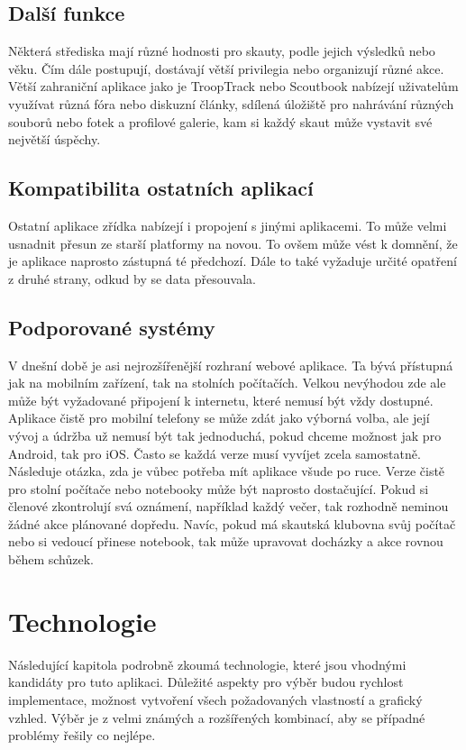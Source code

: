 \documentclass[twoside]{ctuthesis}
\begin{document}
\section{Další funkce} 
Některá střediska mají různé hodnosti pro skauty, podle jejich výsledků nebo věku. Čím dále postupují, dostávají větší privilegia nebo organizují různé akce. \\
Větší zahraniční aplikace jako je TroopTrack nebo Scoutbook nabízejí uživatelům využívat různá fóra nebo diskuzní články, sdílená úložiště pro nahrávání různých souborů nebo fotek a profilové galerie, kam si každý skaut může vystavit své největší úspěchy.

\section{Kompatibilita ostatních aplikací} 
Ostatní aplikace zřídka nabízejí i propojení s jinými aplikacemi. To může velmi usnadnit přesun ze starší platformy na novou. To ovšem může vést k domnění, že je aplikace naprosto zástupná té předchozí. Dále to také vyžaduje určité opatření z druhé strany, odkud by se data přesouvala.

\section{Podporované systémy} 
V dnešní době je asi nejrozšířenější rozhraní webové aplikace. Ta bývá přístupná jak na mobilním zařízení, tak na stolních počítačích. Velkou nevýhodou zde ale může být vyžadované připojení k internetu, které nemusí být vždy dostupné. \\
Aplikace čistě pro mobilní telefony se může zdát jako výborná volba, ale její vývoj a údržba už nemusí být tak jednoduchá, pokud chceme možnost jak pro Android, tak pro iOS. Často se každá verze musí vyvíjet zcela samostatně. \\
Následuje otázka, zda je vůbec potřeba mít aplikace všude po ruce. Verze čistě pro stolní počítače nebo notebooky může být naprosto dostačující. Pokud si členové zkontrolují svá oznámení, například každý večer, tak rozhodně neminou žádné akce plánované dopředu. Navíc, pokud má skautská klubovna svůj počítač nebo si vedoucí přinese notebook, tak může upravovat docházky a akce rovnou během schůzek.

\chapter{Technologie}
Následující kapitola podrobně zkoumá technologie, které jsou vhodnými kandidáty pro tuto aplikaci. Důležité aspekty pro výběr budou rychlost implementace, možnost vytvoření všech požadovaných vlastností a grafický vzhled. Výběr je z velmi známých a rozšířených kombinací, aby se případné problémy řešily co nejlépe.
\end{document}
